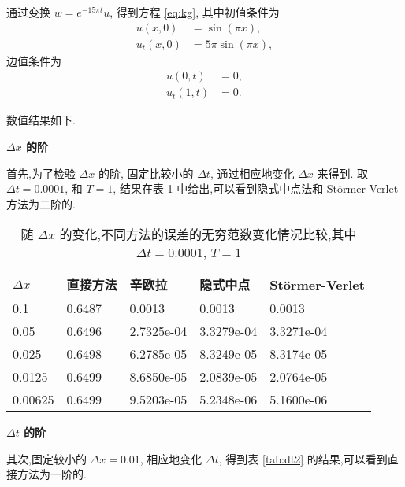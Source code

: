 通过变换 $w=e^{-15\pi t}u$, 得到方程 \eqref{eq:kg}, 其中初值条件为
\begin{equation*}
\begin{aligned}
u(x,0)&=\sin(\pi x),\\
u_t(x,0)&=5\pi \sin(\pi x),
\end{aligned}
\end{equation*}
边值条件为
\begin{equation*}
\begin{aligned}
u(0,t)&=0,\\
u_t(1,t)&=0.
\end{aligned}
\end{equation*}

数值结果如下.

\textbf{$\Delta x$ 的阶}

首先,为了检验 $\Delta x$ 的阶, 固定比较小的 $\Delta t$, 通过相应地变化 $\Delta x$ 来得到. 取 $\Delta t = 0.0001$, 和 $T
= 1$, 结果在表 \ref{tab:dx2} 中给出,可以看到隐式中点法和 St\"{o}rmer-Verlet 方法为二阶的.

\begin{table}[h]
  \centering
\caption{随 $\Delta x$ 的变化,不同方法的误差的无穷范数变化情况比较,其中 $\Delta t=0.0001$, $T=1$}
\begin{tabularx}{\linewidth}{XXXXX}
 \toprule[1.5pt]
$\Delta x$ &直接方法 & 辛欧拉 & 隐式中点 & St\"{o}rmer-Verlet\\
 \midrule[1pt]
 0.1 & 0.6487 & 0.0013 & 0.0013 & 0.0013\\
 0.05 & 0.6496 & 2.7325e-04 & 3.3279e-04 & 3.3271e-04\\
 0.025 & 0.6498 & 6.2785e-05 & 8.3249e-05 & 8.3174e-05\\
 0.0125 & 0.6499 & 8.6850e-05 & 2.0839e-05 & 2.0764e-05\\
 0.00625 & 0.6499 & 9.5203e-05 & 5.2348e-06 & 5.1600e-06\\
 \bottomrule[1.5pt]
\end{tabularx}
  \label{tab:dx2}
\end{table}

\textbf{$\Delta t$ 的阶}

其次,固定较小的 $\Delta x = 0.01$, 相应地变化 $\Delta t$, 得到表 \ref{tab:dt2} 的结果,可以看到直接方法为一阶的.


